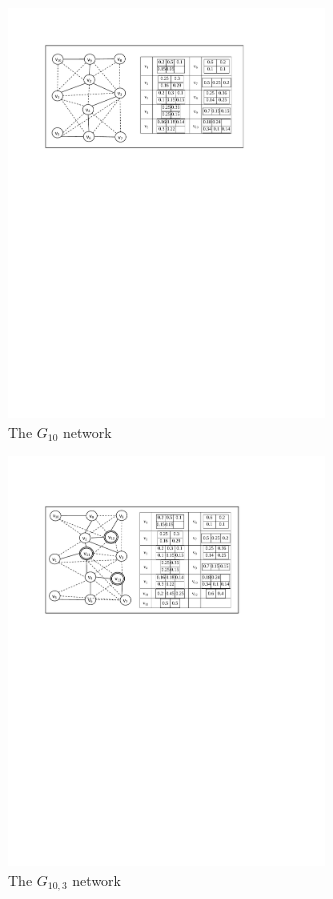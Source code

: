      \begin{figure}[htbp]
     \begin{center}
     \includegraphics[width=3.3in]{g10.pdf}
     \caption{The $G_{10}$ network}
     \label{sim:g10}
     \end{center}
     \end{figure}
\vspace*{-0.2in}
     \begin{figure}[htbp]
     \begin{center}
     \includegraphics[width=3.3in]{g10-3r.pdf}
     \caption{The $G_{10,3}$ network}
     \label{sim:g10r}
     \end{center}
     \end{figure}

